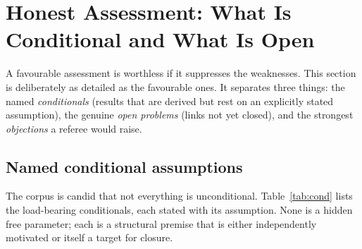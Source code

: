 \documentclass[11pt]{article}
\begin{document}
\section{Honest Assessment: What Is Conditional and What Is Open}
\label{sec:honest}

A favourable assessment is worthless if it suppresses the weaknesses.  This section
is deliberately as detailed as the favourable ones.  It separates three things: the
named \emph{conditionals} (results that are derived but rest on an explicitly stated
assumption), the genuine \emph{open problems} (links not yet closed), and the
strongest \emph{objections} a referee would raise.

\subsection{Named conditional assumptions}

The corpus is candid that not everything is unconditional.  Table~\ref{tab:cond}
lists the load-bearing conditionals, each stated with its assumption.  None is a
hidden free parameter; each is a structural premise that is either independently
motivated or itself a target for closure.
\end{document}
